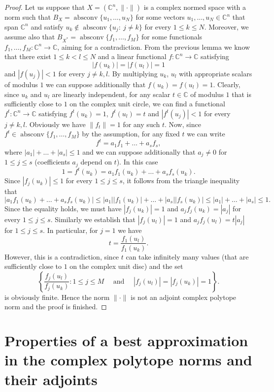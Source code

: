 \documentclass[12pt, reqno]{amsart}
\theoremstyle{definition}
\theoremstyle{remark}
\numberwithin{equation}{section}
\DeclareMathOperator{\absconv}{absconv}
\begin{document}
\begin{proof}

Let us suppose that $X = (\mathbb{C}^n, \| \cdot \|)$ is a complex normed space with a norm such that $B_X=\absconv\{u_1, \ldots, u_N\}$ for some vectors $u_1, \ldots, u_N \in \mathbb{C}^n$ that span $\mathbb{C}^n$ and satisfy $u_k \not \in \absconv\{u_j: \ j \neq k\}$ for every $1 \leq k \leq N$. Moreover, we assume also that $B_{X^*} = \absconv \{f_1, \ldots, f_M\}$ for some functionals $f_1, \ldots, f_M: \mathbb{C}^n \to \mathbb{C}$, aiming for a contradiction. From the previous lemma we know that there exist $1 \leq k < l \leq N$ and a linear functional $f: \mathbb{C}^n \to \mathbb{C}$ satisfying
$$|f(u_k)|=|f(u_l)|=1$$
and $|f(u_j)|<1$ for every $j \neq k, l$. By multiplying $u_k$, $u_l$ with appropriate scalars of modulus $1$ we can suppose additionally that $f(u_k)=f(u_l)=1$. Clearly, since $u_k$ and $u_l$ are linearly independent, for any scalar $t \in \mathbb{C}$ of modulus $1$ that is sufficiently close to $1$ on the complex unit circle, we can find a functional $f^t: \mathbb{C}^n \to \mathbb{C}$ satisfying $f^t(u_k)=1$, $f^t(u_l)=t$ and $|f^t(u_j)|<1$ for every $j \neq k, l$. Obviously we have $\|f_t\|=1$ for any such $t$. Now, since $f^t \in  \absconv \{f_1, \ldots, f_M\}$ by the assumption, for any fixed $t$ we can write
$$f^t=a_1f_1 + \ldots + a_sf_s,$$
where $|a_1| + \ldots + |a_s| \leq 1$ and we can suppose additionally that $a_j \neq 0$ for $1 \leq j \leq s$ (coefficients $a_j$ depend on $t$). In this case
$$1=f^t(u_k) = a_1f_1(u_k) + \ldots + a_sf_s(u_k).$$
Since $|f_j(u_k)| \leq 1$ for every $1 \leq j \leq s$, it follows from the triangle inequality that
$$|a_1f_1(u_k) + \ldots + a_sf_s(u_k)| \leq |a_1||f_1(u_k)| + \ldots + |a_s||f_s(u_k)| \leq |a_1| + \ldots + |a_s| \leq 1.$$
Since the equality holds, we must have $|f_j(u_k)|=1$ and $a_jf_j(u_k)=|a_j|$ for every $1 \leq j \leq s$. Similarly we establish that $|f_j(u_l)|=1$ and $a_jf_j(u_l)=t|a_j|$ for $1 \leq j \leq s$. In particular, for $j=1$ we have
$$t = \frac{f_1(u_l)}{f_1(u_k)}.$$
However, this is a contradiction, since $t$ can take infinitely many values (that are sufficiently close to $1$ on the complex unit disc) and the set
$$ \left \{\frac{f_j(u_l)}{f_j(u_k)}: 1 \leq j \leq M \quad \text{ and } \quad |f_j(u_l)|=|f_j(u_k)|=1 \right \}.$$
is obviously finite. Hence the norm $\| \cdot \|$ is not an adjoint complex polytope norm and the proof is finished.
\end{proof}

\section{Properties of a best approximation in the complex polytope norms and their adjoints}
\label{sectionproperties}
\end{document}
